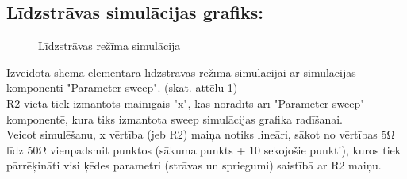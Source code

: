\documentclass {report}
\begin{document}
\subsection{Līdzstrāvas simulācijas grafiks:}
\begin{figure}[h]
    \centering
    \caption{Līdzstrāvas režīma simulācija}
    \label{fig:4th}
\end{figure}
    
\indent Izveidota shēma elementāra līdzstrāvas režīma simulācijai ar simulācijas komponenti "Parameter sweep". (skat. attēlu \ref{fig:4th})\\
R2 vietā tiek izmantots mainīgais "x", kas norādīts arī "Parameter sweep" komponentē, kura tiks izmantota sweep simulācijas grafika radīšanai. \\ Veicot simulēšanu, x vērtība (jeb R2) maiņa notiks lineāri, sākot no vērtības 5Ω līdz 50Ω vienpadsmit punktos (sākuma punkts + 10 sekojošie punkti), kuros tiek pārrēķināti visi ķēdes parametri (strāvas un spriegumi) saistībā ar R2 maiņu.\\
\end{document}
